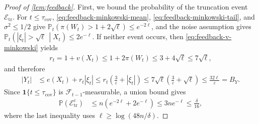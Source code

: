 \documentclass[11pt]{article}
\newcommand{\Pp}{\mathbb P}
\newcommand{\F}{\mathcal F}
\newcommand{\1}{\mathbf 1}
\newcommand{\eps}{\varepsilon}
\begin{document}
\begin{proof}[Proof of \cref{lem:feedback}]
    First, we bound the probability of the truncation event $\mathcal E_{\mathrm{tr}}$.
    For $t\leq\tau_{\mathrm{cov}}$,
    \eqref{eq:feedback-minkowski-mean},
    \eqref{eq:feedback-minkowski-tail}, and
    $\sigma^2\leq1/2$ give
    $\Pp_t\left(
        \pi(W_t)>1+2\sqrt\ell
        \right)
        \leq e^{-2\ell}$,
    and the noise assumption gives
    $\Pp_t\left(
        |\xi_t|>\sqrt\ell
        \,\middle|X_t
        \right)
        \leq
        2e^{-\ell}$.
    If neither event occurs, then
    \eqref{eq:feedback-v-minkowski} yields
    \begin{align}
        r_t
        =1+v(X_t)
        \leq
        1+2\pi(W_t)
        \leq
        3+4\sqrt\ell
        \leq
        7\sqrt\ell,
    \end{align}
    and therefore
    \begin{align}
        |Y_t|
         & \leq
        e(X_t)+r_t|\xi_t|
        \leq
        r_t\left(\frac3\eps+|\xi_t|\right)
        \leq
        7\sqrt\ell
        \left(
        \frac3\eps+\sqrt\ell
        \right)
        \leq
        \frac{32\ell}{\eps}
        =B_Y.
    \end{align}
    Since $\1\{t\leq\tau_{\mathrm{cov}}\}$ is
    $\F_{t-1}$-measurable, a union bound gives
    \begin{align}
        \Pp(\mathcal E_{\mathrm{tr}}^c)
         & \leq
        n\left(e^{-2\ell}+2e^{-\ell}\right)
        \leq
        3ne^{-\ell}
        \leq
        \frac{\delta}{16},
        \label{eq:feedback-truncation-event}
    \end{align}
    where the last inequality uses
    $\ell\geq\log(48n/\delta)$.


\end{proof}
\end{document}
